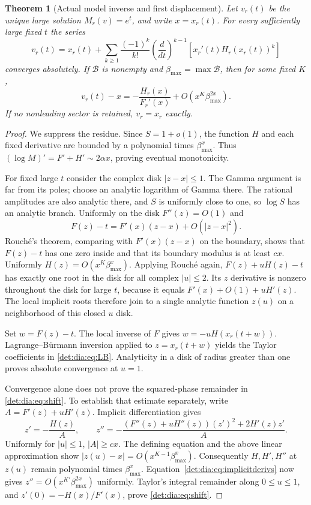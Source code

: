 \documentclass[11pt,letterpaper]{article}
\numberwithin{equation}{section}
\newtheorem{theorem}{Theorem}[section]
\theoremstyle{definition}\newtheorem{definition}[theorem]{Definition}
\theoremstyle{remark}\newtheorem{remark}[theorem]{Remark}
\begin{document}
\begin{theorem}[Actual model inverse and first displacement]\label{det:dia:thm:inverse}
Let $v_r(t)$ be the unique large solution $M_r(v)=e^t$, and write
$x=x_r(t)$. For every sufficiently large fixed $t$ the series
\begin{equation}\label{det:dia:eq:LB}
 v_r(t)=x_r(t)+\sum_{k\geq1}\frac{(-1)^k}{k!}
 \left(\frac{d}{dt}\right)^{k-1}
 \left[x_r'(t)H_r(x_r(t))^k\right]
\end{equation}
converges absolutely. If $\mathcal B$ is nonempty and
$\beta_{\max}=\max\mathcal B$, then for some fixed $K$,
\begin{equation}\label{det:dia:eq:shift}
 v_r(t)-x=-\frac{H_r(x)}{F_r'(x)}
 +O\left(x^K\beta_{\max}^{2x}\right).
\end{equation}
If no nonleading sector is retained, $v_r=x_r$ exactly.
\end{theorem}
\begin{proof}
We suppress the residue. Since $S=1+o(1)$, the function $H$ and each
fixed derivative are bounded by a polynomial times $\beta_{\max}^x$.
Thus $(\log M)'=F'+H'\sim2\alpha x$, proving eventual monotonicity.

For fixed large $t$ consider the complex disk $|z-x|\leq1$. The Gamma
argument is far from its poles; choose an analytic logarithm of Gamma
there. The rational amplitudes are also analytic there, and $S$ is
uniformly close to one, so $\log S$ has an analytic branch. Uniformly
on the disk $F''(z)=O(1)$ and
\[
 F(z)-t=F'(x)(z-x)+O(|z-x|^2).
\]
Rouch\'e's theorem, comparing with $F'(x)(z-x)$ on the boundary,
shows that $F(z)-t$ has one zero inside and that its boundary modulus
is at least $c x$. Uniformly $H(z)=O(x^K\beta_{\max}^x)$. Applying
Rouch\'e again, $F(z)+uH(z)-t$ has exactly one root in the disk for
all complex $|u|\leq2$. Its $z$ derivative is nonzero throughout the
disk for large $t$, because it equals $F'(x)+O(1)+uH'(z)$.
The local implicit roots therefore join to a single analytic function
$z(u)$ on a neighborhood of this closed $u$ disk.

Set $w=F(z)-t$. The local inverse of $F$ gives
$w=-uH(x_r(t+w))$. Lagrange--B\"urmann inversion applied to
$z=x_r(t+w)$ yields the Taylor coefficients in \eqref{det:dia:eq:LB}.
Analyticity in a disk of radius greater than one proves absolute
convergence at $u=1$.

Convergence alone does not prove the squared-phase remainder in
\eqref{det:dia:eq:shift}. To establish that estimate separately, write
$A=F'(z)+uH'(z)$. Implicit differentiation gives
\begin{equation}\label{det:dia:eq:implicitderivs}
 z'=-\frac{H(z)}A,\qquad
 z''=-\frac{(F''(z)+uH''(z))(z')^2+2H'(z)z'}A.
\end{equation}
Uniformly for $|u|\leq1$, $|A|\geq c x$. The defining equation and
the above linear approximation show
$|z(u)-x|=O(x^{K-1}\beta_{\max}^x)$. Consequently $H,H',H''$ at
$z(u)$ remain polynomial times $\beta_{\max}^x$.
Equation~\eqref{det:dia:eq:implicitderivs} now gives
$z''=O(x^{K'}\beta_{\max}^{2x})$ uniformly. Taylor's integral
remainder along $0\leq u\leq1$, and
$z'(0)=-H(x)/F'(x)$, prove \eqref{det:dia:eq:shift}.
\end{proof}
\end{document}
